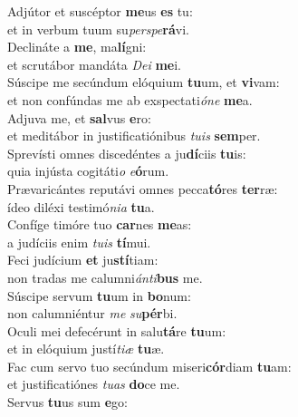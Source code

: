 \evenverse Adjútor et suscéptor \textbf{me}us \textbf{es} tu:~\*\\
\evenverse et in verbum tuum su\textit{per}\textit{spe}\textbf{rá}vi.\\
\oddverse Declináte a \textbf{me}, ma\textbf{lí}gni:~\*\\
\oddverse et scrutábor mandáta \textit{De}\textit{i} \textbf{me}i.\\
\evenverse Súscipe me secúndum elóquium \textbf{tu}um, et \textbf{vi}vam:~\*\\
\evenverse et non confúndas me ab exspectati\textit{ó}\textit{ne} \textbf{me}a.\\
\oddverse Adjuva me, et \textbf{sal}vus \textbf{e}ro:~\*\\
\oddverse et meditábor in justificatiónibus \textit{tu}\textit{is} \textbf{sem}per.\\
\evenverse Sprevísti omnes discedéntes a ju\textbf{dí}ciis \textbf{tu}is:~\*\\
\evenverse quia injústa cogitáti\textit{o} \textit{e}\textbf{ó}rum.\\
\oddverse Prævaricántes reputávi omnes pecca\textbf{tó}res \textbf{ter}ræ:~\*\\
\oddverse ídeo diléxi testimó\textit{ni}\textit{a} \textbf{tu}a.\\
\evenverse Confíge timóre tuo \textbf{car}nes \textbf{me}as:~\*\\
\evenverse a judíciis enim \textit{tu}\textit{is} \textbf{tí}mui.\\
\oddverse Feci judícium \textbf{et} ju\textbf{stí}tiam:~\*\\
\oddverse non tradas me calumni\textit{án}\textit{ti}\textbf{bus} me.\\
\evenverse Súscipe servum \textbf{tu}um in \textbf{bo}num:~\*\\
\evenverse non calumniéntur \textit{me} \textit{su}\textbf{pér}bi.\\
\oddverse Oculi mei defecérunt in salu\textbf{tá}re \textbf{tu}um:~\*\\
\oddverse et in elóquium justí\textit{ti}\textit{æ} \textbf{tu}æ.\\
\evenverse Fac cum servo tuo secúndum miseri\textbf{cór}diam \textbf{tu}am:~\*\\
\evenverse et justificatiónes \textit{tu}\textit{as} \textbf{do}ce me.\\
\oddverse Servus \textbf{tu}us sum \textbf{e}go:~\*\\
